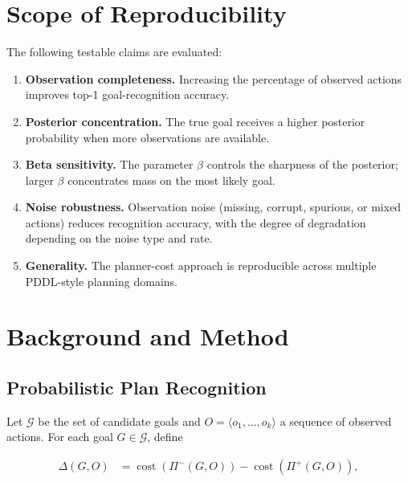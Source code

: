\documentclass[11pt,a4paper]{article}
\begin{document}
\section{Scope of Reproducibility}

The following testable claims are evaluated:

\begin{enumerate}
  \item \textbf{Observation completeness.} Increasing the percentage of observed
        actions improves top-1 goal-recognition accuracy.
  \item \textbf{Posterior concentration.} The true goal receives a higher
        posterior probability when more observations are available.
  \item \textbf{Beta sensitivity.} The parameter $\beta$ controls the sharpness
        of the posterior; larger $\beta$ concentrates mass on the most
        likely goal.
  \item \textbf{Noise robustness.} Observation noise (missing, corrupt, spurious,
        or mixed actions) reduces recognition accuracy, with the
        degree of degradation depending on the noise type and rate.
  \item \textbf{Generality.} The planner-cost approach is reproducible across
        multiple PDDL-style planning domains.
\end{enumerate}

\section{Background and Method}

\subsection{Probabilistic Plan Recognition}

Let $\mathcal{G}$ be the set of candidate goals and $O = \langle o_1,\ldots,o_k\rangle$
a sequence of observed actions.  For each goal $G \in \mathcal{G}$, define

\begin{align}
  \Delta(G, O) &= \operatorname{cost}(\Pi^-(G,O)) - \operatorname{cost}(\Pi^+(G,O)),
\end{align}
\end{document}
